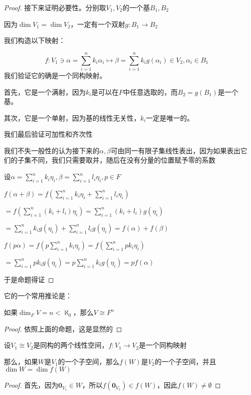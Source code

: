 \documentclass[12pt, a4paper, oneside, UTF8]{ctexbook}
\begin{document}
\begin{para}{0}
\begin{proof}
						接下来证明必要性。分别取$V_1,V_2$的一个基$B_1,B_2$

						因为$\dim V_1 = \dim V_2$，一定有一个双射$g:B_1 \to B_2$

						我们构造以下映射：

						\begin{equation}
							f: V_1 \ni \alpha = \sum\limits_{i=1}^{n} k_i \alpha_i \mapsto \beta = \sum\limits_{i=1}^{n} k_i g(\alpha_i) \in V_2,\alpha_i \in B_1
						\end{equation}
						我们验证它的确是一个同构映射。

						首先，它是一个满射，因为$k_i$是可以在$F$中任意选取的，而$B_2=g(B_1)$是一个基。

						其次，它是一个单射，因为基的线性无关性，$k_i$一定是唯一的。

						我们最后验证可加性和齐次性

						我们不失一般性的认为接下来的$\alpha ,\beta $可由同一有限子集线性表出，因为如果表出它们的子集不同，我们只需要取并，随后在没有分量的位置赋予零的系数

						设$\alpha =\sum\limits_{i=1}^{n} k_i \eta_i ,\beta =\sum\limits_{i=1}^{n} l_i \eta_i,p \in F$

						$f(\alpha +\beta )=f(\sum\limits_{i=1}^{n} k_i \eta_i+\sum\limits_{i=1}^{n} l_i \eta_i)$

						$=f\left(\sum\limits_{i=1}^{n} (k_i+l_i) \eta_i\right)=\sum\limits_{i=1}^{n} (k_i+l_i) g(\eta_i)$

						$=\sum\limits_{i=1}^{n} k_i g(\eta_i)+\sum\limits_{i=1}^{n} l_i g(\eta_i)=f(\alpha )+f(\beta )$

						$f(p \alpha )=f(p\sum\limits_{i=1}^{n} k_i \eta_i)=f(\sum\limits_{i=1}^{n} pk_i \eta_i)$

						$=\sum\limits_{i=1}^{n} pk_i g(\eta_i)=p\sum\limits_{i=1}^{n} k_i g(\eta_i)=pf(\alpha )$

						于是命题得证
					\end{proof}
					它的一个常用推论是：
					\begin{corollary}{}{}
						如果$\dim_F V = n < \aleph_0$，那么$V \cong F^n$
					\end{corollary}
					\begin{proof}
						依照上面的命题，这是显然的
					\end{proof}
				\point{}
					\begin{proposition}
						设$V_1 \cong V_2$是同构的两个线性空间，$f:V_1 \to V_2$是一个同构映射
						
						那么，如果$W$是$V_1$的一个子空间，那么$f(W)$是$V_2$的一个子空间，并且$\dim W = \dim f(W)$
					\end{proposition}
					\begin{proof}
						首先，因为$\mathbf{0}_{V_1} \in W$，所以$f(\mathbf{0}_{V_1}) \in f(W)$，因此$f(W) \neq \emptyset$


\end{proof}
\end{para}
\end{document}
